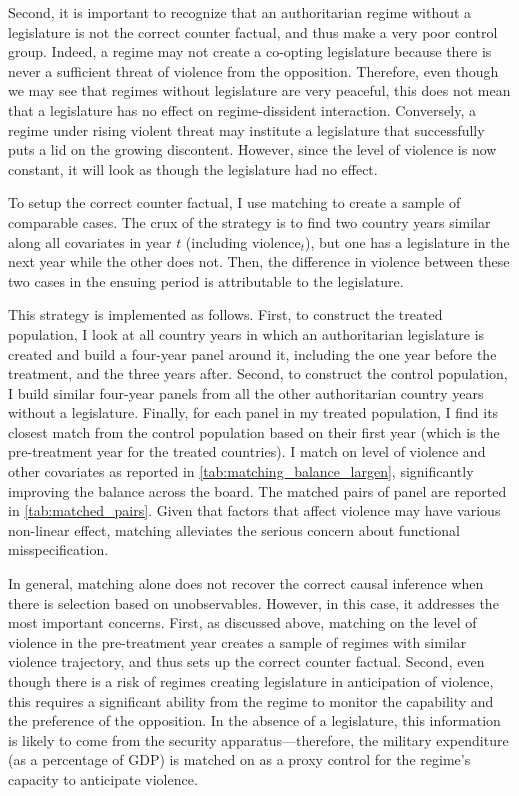 \documentclass[12pt]{article}
\begin{document}
Second, it is important to recognize that an authoritarian regime without a legislature is not the correct counter factual, and thus make a very poor control group. Indeed, a regime may not create a co-opting legislature because there is never a sufficient threat of violence from the opposition. Therefore, even though we may see that regimes without legislature are very peaceful, this does not mean that a legislature has no effect on regime-dissident interaction. Conversely, a regime under rising violent threat may institute a legislature that successfully puts a lid on the growing discontent. However, since the level of violence is now constant, it will look as though the legislature had no effect.

To setup the correct counter factual, I use matching to create a sample of comparable cases. The crux of the strategy is to find two country years similar along all covariates in year $t$ (including $\text{violence}_t$), but one has a legislature in the next year while the other does not. Then, the difference in violence between these two cases in the ensuing period is attributable to the legislature.

This strategy is implemented as follows. First, to construct the treated population, I look at all country years in which an authoritarian legislature is created and build a four-year panel around it, including the one year before the treatment, and the three years after. Second, to construct the control population, I build similar four-year panels from all the other authoritarian country years without a legislature. Finally, for each panel in my treated population, I find its closest match from the control population based on their first year (which is the pre-treatment year for the treated countries). I match on level of violence and other covariates as reported in \autoref{tab:matching_balance_largen}, significantly improving the balance across the board. The matched pairs of panel are reported in \autoref{tab:matched_pairs}. Given that factors that affect violence may have various non-linear effect, matching alleviates the serious concern about functional misspecification. 

In general, matching alone does not recover the correct causal inference when there is selection based on unobservables. However, in this case, it addresses the most important concerns. First, as discussed above, matching on the level of violence in the pre-treatment year creates a sample of regimes with similar violence trajectory, and thus sets up the correct counter factual. Second, even though there is a risk of regimes creating legislature in anticipation of violence, this requires a significant ability from the regime to monitor the capability and the preference of the opposition. In the absence of a legislature, this information is likely to come from the security apparatus---therefore, the military expenditure (as a percentage of GDP) is matched on as a proxy control for the regime's capacity to anticipate violence.
\end{document}

